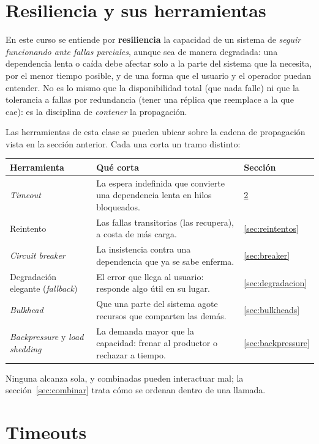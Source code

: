 \documentclass[variant=apuntes,cover=institutional,mode=screen]{ua-engineering-v6-article}
\begin{document}
\section{Resiliencia y sus herramientas}

En este curso se entiende por \textbf{resiliencia} la capacidad de un sistema de \emph{seguir funcionando ante fallas parciales}, aunque sea de manera degradada: una dependencia lenta o caída debe afectar solo a la parte del sistema que la necesita, por el menor tiempo posible, y de una forma que el usuario y el operador puedan entender. No es lo mismo que la disponibilidad total (que nada falle) ni que la tolerancia a fallas por redundancia (tener una réplica que reemplace a la que cae): es la disciplina de \emph{contener} la propagación.

Las herramientas de esta clase se pueden ubicar sobre la cadena de propagación vista en la sección anterior. Cada una corta un tramo distinto:

\begin{center}
\begin{tabular}{p{}p{}p{}}
\toprule
\textbf{Herramienta} & \textbf{Qué corta} & \textbf{Sección} \\
\midrule
\emph{Timeout} & La espera indefinida que convierte una dependencia lenta en hilos bloqueados. & \ref{sec:timeouts} \\
Reintento & Las fallas transitorias (las recupera), a costa de más carga. & \ref{sec:reintentos} \\
\emph{Circuit breaker} & La insistencia contra una dependencia que ya se sabe enferma. & \ref{sec:breaker} \\
Degradación elegante (\emph{fallback}) & El error que llega al usuario: responde algo útil en su lugar. & \ref{sec:degradacion} \\
\emph{Bulkhead} & Que una parte del sistema agote recursos que comparten las demás. & \ref{sec:bulkheads} \\
\emph{Backpressure} y \emph{load shedding} & La demanda mayor que la capacidad: frenar al productor o rechazar a tiempo. & \ref{sec:backpressure} \\
\bottomrule
\end{tabular}
\end{center}

Ninguna alcanza sola, y combinadas pueden interactuar mal; la sección~\ref{sec:combinar} trata cómo se ordenan dentro de una llamada.

\section{Timeouts}\label{sec:timeouts}
\end{document}
